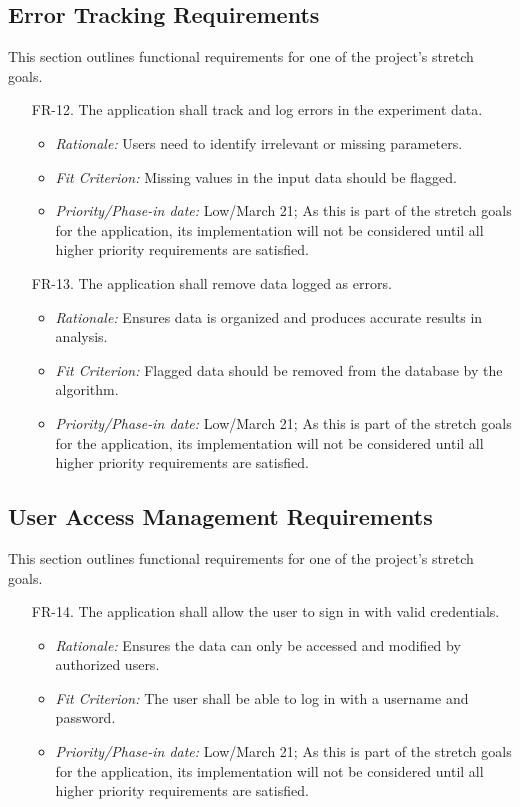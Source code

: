 \documentclass[12pt]{article}
\begin{document}
\subsection{Error Tracking Requirements}
This section outlines functional requirements for one of the project's stretch goals.
\begin{enumerate}
  \item[FR-12.] The application shall track and log errors in the experiment data.
  \begin{itemize}
    \item \textit{Rationale:} Users need to identify irrelevant or missing parameters.
    \item \textit{Fit Criterion:} Missing values in the input data should be flagged.
    \item \textit{Priority/Phase-in date:} Low/March 21; As this is part of the stretch goals for the application, its implementation will not be considered until all higher priority requirements are satisfied.
  \end{itemize}
  \item[FR-13.] The application shall remove data logged as errors.
  \begin{itemize}
    \item \textit{Rationale:} Ensures data is organized and produces accurate results in analysis.
    \item \textit{Fit Criterion:} Flagged data should be removed from the database by the algorithm.
    \item \textit{Priority/Phase-in date:} Low/March 21; As this is part of the stretch goals for the application, its implementation will not be considered until all higher priority requirements are satisfied.
  \end{itemize}
\end{enumerate}

\subsection{User Access Management Requirements}
This section outlines functional requirements for one of the project's stretch goals.
\begin{enumerate}
  \item[FR-14.] The application shall allow the user to sign in with valid credentials.
  \begin{itemize}
    \item \textit{Rationale:} Ensures the data can only be accessed and modified by authorized users.
    \item \textit{Fit Criterion:} The user shall be able to log in with a username and password.
    \item \textit{Priority/Phase-in date:} Low/March 21; As this is part of the stretch goals for the application, its implementation will not be considered until all higher priority requirements are satisfied.
  \end{itemize}
\end{enumerate}
\end{document}
